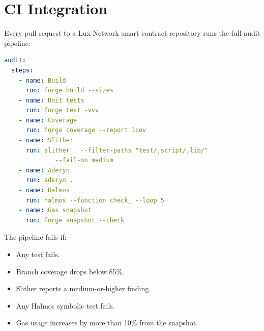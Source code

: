 \section{CI Integration}


Every pull request to a Lux Network smart contract repository runs the full audit pipeline:

\begin{lstlisting}[language=YAML,caption={CI audit pipeline}]
audit:
  steps:
    - name: Build
      run: forge build --sizes
    - name: Unit tests
      run: forge test -vvv
    - name: Coverage
      run: forge coverage --report lcov
    - name: Slither
      run: slither . --filter-paths "test/,script/,lib/"
              --fail-on medium
    - name: Aderyn
      run: aderyn .
    - name: Halmos
      run: halmos --function check_ --loop 5
    - name: Gas snapshot
      run: forge snapshot --check
\end{lstlisting}

The pipeline fails if:
\begin{itemize}[nosep]
  \item Any test fails.
  \item Branch coverage drops below 85\%.
  \item Slither reports a medium-or-higher finding.
  \item Any Halmos symbolic test fails.
  \item Gas usage increases by more than 10\% from the snapshot.
\end{itemize}


